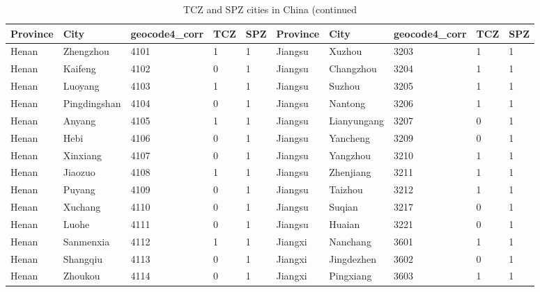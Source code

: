\documentclass[12pt]{article}
\begin{document}
\begin{table}[!htbp] \centering
  \caption{TCZ and SPZ cities in China (continued}
  \begin{adjustbox}{width=\textwidth, totalheight=\baselineskip,keepaspectratio}
    \label{tab:appendix2}
\begin{tabular}{llllllllll}
\hline
Province       & City         & geocode4\_corr & TCZ & SPZ & Province & City        & geocode4\_corr & TCZ & SPZ \\
\hline
Henan          & Zhengzhou    & 4101           & 1   & 1   & Jiangsu  & Xuzhou      & 3203           & 1   & 1   \\
Henan          & Kaifeng      & 4102           & 0   & 1   & Jiangsu  & Changzhou   & 3204           & 1   & 1   \\
Henan          & Luoyang      & 4103           & 1   & 1   & Jiangsu  & Suzhou      & 3205           & 1   & 1   \\
Henan          & Pingdingshan & 4104           & 0   & 1   & Jiangsu  & Nantong     & 3206           & 1   & 1   \\
Henan          & Anyang       & 4105           & 1   & 1   & Jiangsu  & Lianyungang & 3207           & 0   & 1   \\
Henan          & Hebi         & 4106           & 0   & 1   & Jiangsu  & Yancheng    & 3209           & 0   & 1   \\
Henan          & Xinxiang     & 4107           & 0   & 1   & Jiangsu  & Yangzhou    & 3210           & 1   & 1   \\
Henan          & Jiaozuo      & 4108           & 1   & 1   & Jiangsu  & Zhenjiang   & 3211           & 1   & 1   \\
Henan          & Puyang       & 4109           & 0   & 1   & Jiangsu  & Taizhou     & 3212           & 1   & 1   \\
Henan          & Xuchang      & 4110           & 0   & 1   & Jiangsu  & Suqian      & 3217           & 0   & 1   \\
Henan          & Luohe        & 4111           & 0   & 1   & Jiangsu  & Huaian      & 3221           & 0   & 1   \\
Henan          & Sanmenxia    & 4112           & 1   & 1   & Jiangxi  & Nanchang    & 3601           & 1   & 1   \\
Henan          & Shangqiu     & 4113           & 0   & 1   & Jiangxi  & Jingdezhen  & 3602           & 0   & 1   \\
Henan          & Zhoukou      & 4114           & 0   & 1   & Jiangxi  & Pingxiang   & 3603           & 1   & 1   \\

\end{tabular}
\end{adjustbox}
\end{table}
\end{document}
